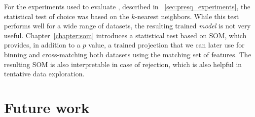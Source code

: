 For the experiments used to evaluate \PresQ, described in ~\ref{sec:presq_experiments},
the statistical test of choice was based on the $k$-nearest neighbors. While this test
performs well for a wide range of datasets, the resulting trained \emph{model} is not
very useful.
Chapter~\ref{chapter:som} introduces a statistical test based on \gls{SOM}, which provides,
in addition to a $p$ value, a trained projection that we can later use for binning and
cross-matching both datasets using the matching set of features. The resulting \gls{SOM}
is also interpretable in case of rejection, which is also helpful in tentative data exploration.

\section{Future work}

